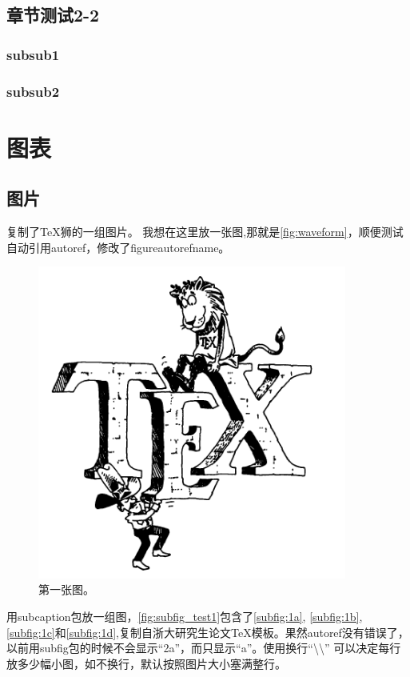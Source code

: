 \documentclass{myreport}
\begin{document}
\subsection{章节测试2-2}
\subsubsection{subsub1}
\subsubsection{subsub2}

\section{图表}
\subsection{图片}
复制了TeX狮的一组图片。
我想在这里放一张图,那就是\autoref{fig:waveform}，顺便测试自动引用autoref，修改了figureautorefname。
\begin{figure}[htbp]
\centering
\includegraphics[width=4in]{Chapter1}
\caption{第一张图。}
\label{fig:waveform}
\end{figure}

用subcaption包放一组图，\autoref{fig:subfig_test1}包含了\autoref{subfig:1a}, \autoref{subfig:1b},\autoref{subfig:1c}和\autoref{subfig:1d},复制自浙大研究生论文TeX模板。果然autoref没有错误了，以前用subfig包的时候不会显示“2a”，而只显示“a”。使用换行“\textbackslash\textbackslash” 可以决定每行放多少幅小图，如不换行，默认按照图片大小塞满整行。
\end{document}
